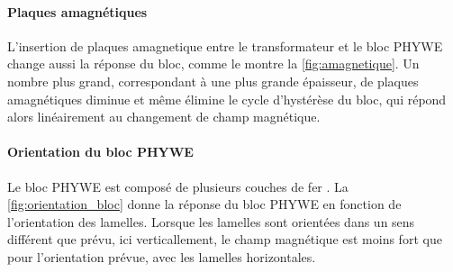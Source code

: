 \paragraph{Plaques amagnétiques}
L'insertion de plaques amagnetique entre le transformateur et le bloc PHYWE change aussi la réponse du bloc, comme le montre la \autoref{fig:amagnetique}. Un nombre plus grand, correspondant à une plus grande épaisseur, de plaques amagnétiques diminue et même élimine le cycle d'hystérèse du bloc, qui répond alors linéairement au changement de champ magnétique.

\paragraph{Orientation du bloc PHYWE}
Le bloc PHYWE est composé de plusieurs couches de fer \cite{bloc_phywe}. La \autoref{fig:orientation_bloc} donne la réponse du bloc PHYWE en fonction de l'orientation des lamelles. Lorsque les lamelles sont orientées dans un sens différent que prévu, ici verticallement, le champ magnétique est moins fort que pour l'orientation prévue, avec les lamelles horizontales.

